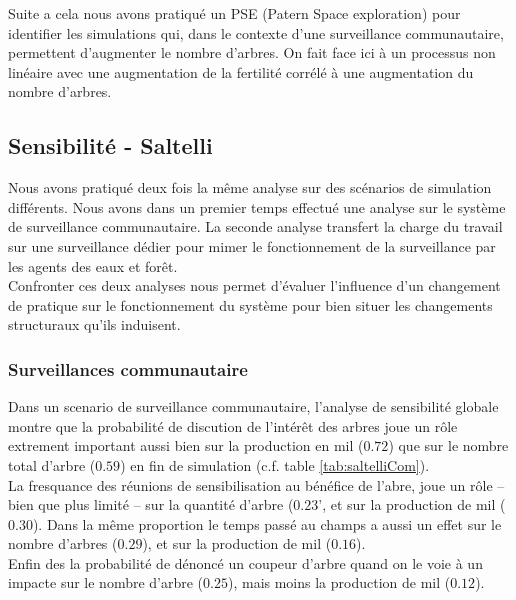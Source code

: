 \documentclass{article}
\begin{document}
Suite a cela nous avons pratiqué un PSE (Patern Space exploration) pour identifier les simulations qui, dans le contexte d'une surveillance communautaire, permettent d'augmenter le nombre d'arbres. On fait face ici à un processus non linéaire avec une augmentation de la fertilité corrélé à une augmentation du nombre d'arbres.

    \subsection{Sensibilité - Saltelli}

    Nous avons pratiqué deux fois la même analyse sur des scénarios de simulation différents. Nous avons dans un premier temps effectué une analyse sur le système de surveillance communautaire. La seconde analyse transfert la charge du travail sur une surveillance dédier pour mimer le fonctionnement de la surveillance par les agents des eaux et forêt.\\
    
    Confronter ces deux analyses nous permet d'évaluer l'influence d'un changement de pratique sur le fonctionnement du système pour bien situer les changements structuraux qu'ils induisent.

    \subsubsection{Surveillances communautaire}

        Dans un scenario de surveillance communautaire, l'analyse de sensibilité globale montre que la probabilité de discution de l'intérêt des arbres joue un rôle extrement important aussi bien sur la production en mil ($0.72$) que sur le nombre total d'arbre ($0.59$) en fin de simulation (c.f. table \ref{tab:saltelliCom}).\\

        La fresquance des réunions de sensibilisation au bénéfice de l'abre, joue un rôle -- bien que plus limité -- sur la quantité d'arbre ($0.23$', et sur la production de mil ($0.30$). Dans la même proportion le temps passé au champs a aussi un effet sur le nombre d'arbres ($0.29$), et sur la production de mil ($0.16$).\\

        Enfin des la probabilité de dénoncé un coupeur d'arbre quand on le voie à un impacte sur le nombre d'arbre ($0.25$), mais moins la production de mil ($0.12$).\\
\end{document}
